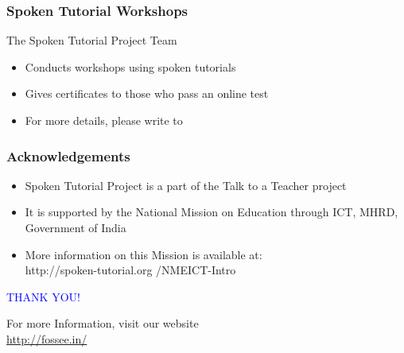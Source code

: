 \documentclass[17pt,compress]{beamer}
\begin{document}
\begin{frame}
\frametitle{Spoken Tutorial Workshops}The Spoken Tutorial Project Team 
\begin{itemize}
\item Conducts workshops using spoken tutorials 
\item Gives certificates to those who pass an online test 
\item For more details, please write to \\ 
\end{itemize}
\end{frame}
\begin{frame}
\frametitle{Acknowledgements}
\begin{itemize}
\item Spoken Tutorial Project is a part of the Talk to a Teacher  project 
\item It is supported by the National Mission on Education through  ICT, MHRD, Government of India 
\item More information on this Mission is available at: \\{\color{blue}http://spoken-tutorial.org /NMEICT-Intro}
\end{itemize}
\end{frame}
\begin{frame}

  \begin{block}{}
  \begin{center}
  \textcolor{blue}{\Large THANK YOU!} 
  \end{center}
  \end{block}
\begin{block}{}
  \begin{center}
    For more Information, visit our website\\
    \url{http://fossee.in/}
  \end{center}  
  \end{block}
\end{frame}
\end{document}
